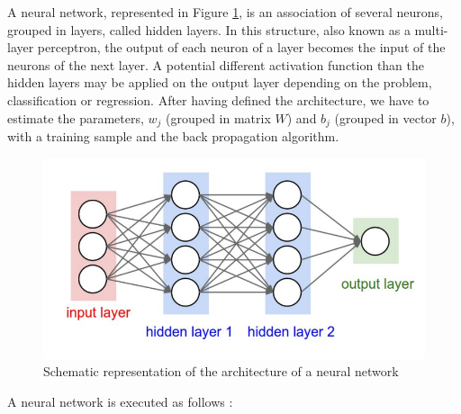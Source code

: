 A neural network, represented in Figure \ref{fig:neural_network}, is an association of several neurons, grouped in layers, called hidden layers. In this structure, also known as a multi-layer perceptron, the output of each neuron of a layer becomes the input of the neurons of the next layer. A potential different activation function than the hidden layers may be applied on the output layer depending on the problem, classification or regression. After having defined the architecture, we have to estimate the parameters, $w_j$ (grouped in matrix $W$) and $b_j$ (grouped in vector $b$), with a training sample and the back propagation algorithm. 

\begin{figure}[H]
    \centering
    \includegraphics[scale = 0.7]{Graph/neural_net.png}
    \caption{Schematic representation of the architecture of a neural network \cite{cours_ML}}
    \label{fig:neural_network}
\end{figure}
A neural network is executed as follows : 
